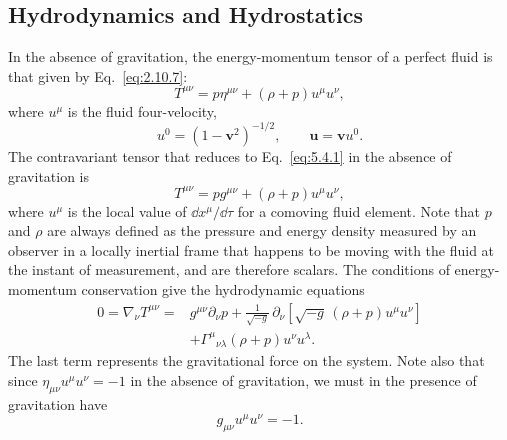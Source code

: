 
\subsection{Hydrodynamics and Hydrostatics}\label{sec:5.4}

In the absence of gravitation, the energy-momentum tensor of a perfect fluid
is that given by Eq.~\eqref{eq:2.10.7}:
\begin{equation}
  T^{\mu\nu}
  =
  p\eta^{\mu\nu}
  +
  (\rho+p)u^\mu u^\nu,
  \tag{5.4.1}\label{eq:5.4.1}
\end{equation}
where \(u^\mu\) is the fluid four-velocity,
\[
  u^0=(1-\mathbf v^2)^{-1/2},
  \qquad
  \mathbf u=\mathbf v u^0.
\]
The contravariant tensor that reduces to Eq.~\eqref{eq:5.4.1} in the absence
of gravitation is
\begin{equation}
  T^{\mu\nu}
  =
  pg^{\mu\nu}
  +
  (\rho+p)u^\mu u^\nu,
  \tag{5.4.2}\label{eq:5.4.2}
\end{equation}
where \(u^\mu\) is the local value of \(\dd x^\mu/\dd\tau\) for a comoving
fluid element. Note that \(p\) and \(\rho\) are always defined as the
pressure and energy density measured by an observer in a locally inertial
frame that happens to be moving with the fluid at the instant of measurement,
and are therefore scalars. The conditions of energy-momentum conservation
give the hydrodynamic equations
\begin{equation}
  \begin{aligned}
    0
    =
    \nabla_\nu T^{\mu\nu}
    ={}&
    g^{\mu\nu}\partial_\nu p
    +
    \frac{1}{\sqrt{-g}}\,
    \partial_\nu
    \left[
      \sqrt{-g}\,(\rho+p)u^\mu u^\nu
    \right]
    \\
    &+
    \Gamma^\mu{}_{\nu\lambda}
    (\rho+p)u^\nu u^\lambda.
  \end{aligned}
  \tag{5.4.3}\label{eq:5.4.3}
\end{equation}
The last term represents the gravitational force on the system. Note also
that since \(\eta_{\mu\nu}u^\mu u^\nu=-1\) in the absence of gravitation,
we must in the presence of gravitation have
\begin{equation}
  g_{\mu\nu}u^\mu u^\nu=-1.
  \tag{5.4.4}\label{eq:5.4.4}
\end{equation}

